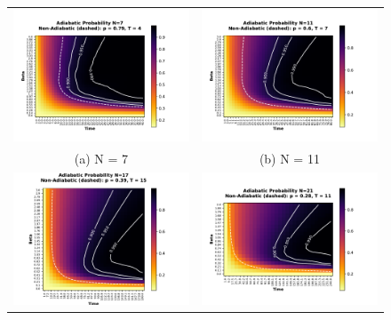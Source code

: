 \documentclass[aps,pra,reprint, onecolumn]{revtex4-2}
\begin{document}
\begin{figure}
\begin{tabular}{cc}
  \includegraphics[width=90mm]{./figures/7_probability_heatmap.pdf} &   \includegraphics[width=90mm]{./figures/11_probability_heatmap.pdf} \\
(a) N = 7 & (b) N = 11\\[6pt]
\includegraphics[width=90mm]{./figures/17_probability_heatmap.pdf} &   \includegraphics[width=90mm]{./figures/21_probability_heatmap.pdf} \\

\end{tabular}
\end{figure}
\end{document}
